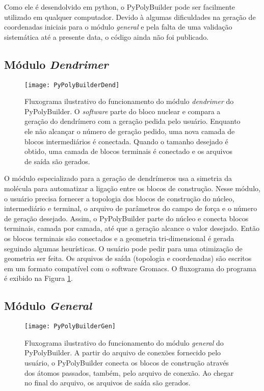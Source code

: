 Como ele é desendolvido em python, o PyPolyBuilder pode ser facilmente utilizado em qualquer computador.
Devido à algumas dificuldades na geração de coordenadas iniciais para o módulo \textit{general} e pela falta de uma validação sistemática até a presente data, o código ainda não foi publicado.


\subsection{Módulo \textit{Dendrimer}}

\begin{figure}[ht!]
\centering
\texttt{[image: PyPolyBuilderDend]}
\caption{Fluxograma ilustrativo do funcionamento do módulo \textit{dendrimer} do PyPolyBuilder.
O \textit{software} parte do bloco nuclear e compara a geração do dendrímero com a geração pedida pelo usuário. 
Enquanto ele não alcançar o número de geração pedido, uma nova camada de blocos intermediários é conectada.
Quando o tamanho desejado é obtido, uma camada de blocos terminais é conectado e os arquivos de saída são gerados.}
\label{fig:PyPolyBuilderDend}
\end{figure}

O módulo especializado para a geração de dendrímeros usa a simetria da molécula para automatizar a ligação entre os blocos de construção.
Nesse módulo, o usuário precisa fornecer a topologia dos blocos de construção do núcleo, intermediário e terminal, o arquivo de parâmetros do campo de força e o número de geração desejado.
Assim, o PyPolyBuilder parte do núcleo e conecta blocos terminais, camada por camada, até que a geração alcance o valor desejado.
Então os blocos terminais são conectados e a geometria tri-dimensional é gerada seguindo algumas heurísticas.
O usuário pode pedir para uma otimização de geometria ser feita.
Os arquivos de saída (topologia e coordenadas) são escritos em um formato compatível com o software Gromacs\cite{VanDerSpoel2005}.
O fluxograma do programa é exibido na Figura \ref{fig:PyPolyBuilderDend}.


\subsection{Módulo \textit{General}}

\begin{figure}[ht!]
\centering
\texttt{[image: PyPolyBuilderGen]}
\caption{Fluxograma ilustrativo do funcionamento do módulo \textit{general} do PyPolyBuilder.
A partir do arquivo de conexões fornecido pelo usuário, o PyPolyBuilder conecta os blocos de construção através dos átomos passados, também, pelo arquivo de conexão.
Ao chegar no final do arquivo, os arquivos de saída são gerados.}
\label{fig:PyPolyBuilderGen}
\end{figure}

